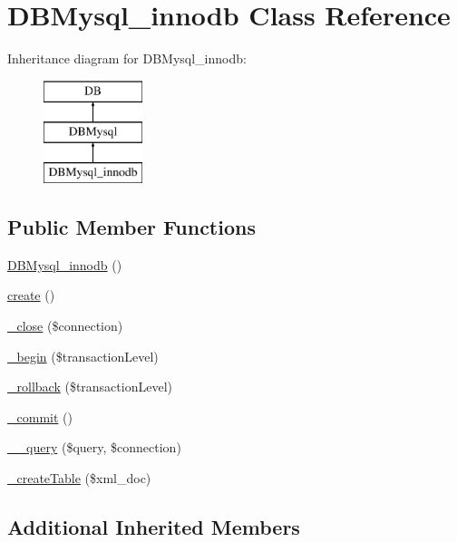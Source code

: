 \hypertarget{classDBMysql__innodb}{}\section{D\+B\+Mysql\+\_\+innodb Class Reference}
\label{classDBMysql__innodb}
Inheritance diagram for D\+B\+Mysql\+\_\+innodb\+:\begin{figure}[H]
\begin{center}
\leavevmode
\includegraphics[height=3.000000cm]{classDBMysql__innodb}
\end{center}
\end{figure}
\subsection*{Public Member Functions}
\begin{DoxyCompactItemize}
\item 
\hyperlink{classDBMysql__innodb_ad56600e5cbe42a0b26f40c2fd34dd4ea}{D\+B\+Mysql\+\_\+innodb} ()
\item 
\hyperlink{classDBMysql__innodb_ac00d0e52855fb50fc453dd78367de102}{create} ()
\item 
\hyperlink{classDBMysql__innodb_a006f982aef8b7fd2909d3912e0afb032}{\+\_\+close} (\$connection)
\item 
\hyperlink{classDBMysql__innodb_a1554d09da5f13e46a812d0ecf7e2efcc}{\+\_\+begin} (\$transaction\+Level)
\item 
\hyperlink{classDBMysql__innodb_af9c5a29501a0748f0b17a6a532008226}{\+\_\+rollback} (\$transaction\+Level)
\item 
\hyperlink{classDBMysql__innodb_a9ffbd5a0d262ae7dd7fb840822a7e543}{\+\_\+commit} ()
\item 
\hyperlink{classDBMysql__innodb_a12af9ec87d5f630d282c2bc2571ee5fe}{\+\_\+\+\_\+query} (\$query, \$connection)
\item 
\hyperlink{classDBMysql__innodb_aa2b634992fbfaaadea5c897b8810b87c}{\+\_\+create\+Table} (\$xml\+\_\+doc)
\end{DoxyCompactItemize}
\subsection*{Additional Inherited Members}


